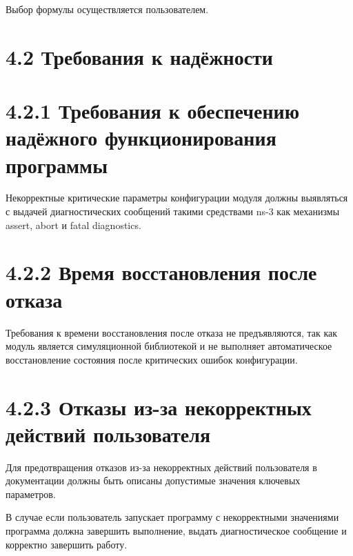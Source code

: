 Выбор формулы осуществляется пользователем.

\section{4.2 Требования к
надёжности}\label{ux442ux440ux435ux431ux43eux432ux430ux43dux438ux44f-ux43a-ux43dux430ux434ux451ux436ux43dux43eux441ux442ux438}

\section{4.2.1 Требования к обеспечению надёжного функционирования
программы}\label{ux442ux440ux435ux431ux43eux432ux430ux43dux438ux44f-ux43a-ux43eux431ux435ux441ux43fux435ux447ux435ux43dux438ux44e-ux43dux430ux434ux451ux436ux43dux43eux433ux43e-ux444ux443ux43dux43aux446ux438ux43eux43dux438ux440ux43eux432ux430ux43dux438ux44f-ux43fux440ux43eux433ux440ux430ux43cux43cux44b}

Некорректные критические параметры конфигурации модуля должны выявляться
с выдачей диагностических сообщений такими средствами ns-3 как механизмы
assert, abort и fatal diagnostics.

\section{4.2.2 Время восстановления после
отказа}\label{ux432ux440ux435ux43cux44f-ux432ux43eux441ux441ux442ux430ux43dux43eux432ux43bux435ux43dux438ux44f-ux43fux43eux441ux43bux435-ux43eux442ux43aux430ux437ux430}

Требования к времени восстановления после отказа не предъявляются, так
как модуль является симуляционной библиотекой и не выполняет
автоматическое восстановление состояния после критических ошибок
конфигурации.

\section{4.2.3 Отказы из-за некорректных действий
пользователя}\label{ux43eux442ux43aux430ux437ux44b-ux438ux437-ux437ux430-ux43dux435ux43aux43eux440ux440ux435ux43aux442ux43dux44bux445-ux434ux435ux439ux441ux442ux432ux438ux439-ux43fux43eux43bux44cux437ux43eux432ux430ux442ux435ux43bux44f}

Для предотвращения отказов из-за некорректных действий пользователя в
документации должны быть описаны допустимые значения ключевых
параметров.

В случае если пользователь запускает программу с некорректными
значениями программа должна завершить выполнение, выдать диагностическое
сообщение и корректно завершить работу.

